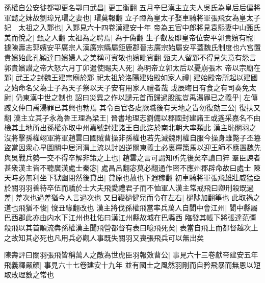孫權自公安徙都卾更名卾曰武昌|{
	更工衡翻}
五月辛巳漢主立夫人吳氏為皇后后偏將軍懿之妹故劉璋兄瑁之妻也|{
	瑁莫報翻}
立子禪為皇太子娶車騎將軍張飛女為皇太子妃　太祖之入鄴也|{
	入鄴見六十四卷漢建安十年}
帝為五官中郎將見袁熙妻中山甄氏美而悅之|{
	甄之人翻}
太祖為之聘焉|{
	為于偽翻}
生子叡及即皇帝位安平郭貴嬪有寵|{
	據陳壽志郭嬪安平廣宗人漢廣宗縣屬鉅鹿郡晉志廣宗始屬安平蓋魏氏制度也六宫置貴嬪始此孔穎達曰嬪婦人之美稱可賓敬也嬪毗賓翻}
甄夫人留鄴不得見失意有怨言郭貴嬪譛之帝大怒六月丁卯遣使賜夫人死|{
	為明帝立郭太后以憂崩張木}
帝以宗廟在鄴|{
	武王之封魏王建宗廟於鄴}
祀太祖於洛陽建始殿如家人禮|{
	建始殿帝所起以建國之始命名父為士子為天子祭以天子安有用家人禮者哉}
戉辰晦日有食之有司奏免太尉|{
	仍東漢中世之制也}
詔曰災異之作以譴元首而歸過股肱豈禹湯罪已之義乎|{
	左傳臧文仲曰禹湯罪已其興也勃焉}
其令百官各䖍厥職後有天地之眚勿復劾三公|{
	復扶又翻}
漢主立其子永為魯王理為梁王|{
	晉書地理志劉備以郡國封建諸王或遙采嘉名不由檢其土地所出孫權亦取中州嘉號封建諸王自此迄於南北朝大率類此}
漢主恥關羽之沒將擊孫權翊軍將軍趙雲曰國賊曹操非孫權也若先滅魏則權自服今操身雖斃子丕簒盜當因衆心早圖關中居河渭上流以討凶逆關東義士必裏糧策馬以迎王師不應置魏先與吳戰兵勢一交不得卒解非策之上也|{
	趙雲之言可謂知所先後矣卒讀曰猝}
羣臣諫者甚衆漢主皆不聽廣漢處士秦宓|{
	處昌呂翻宓莫必翻通作密不應州郡辟命故曰處士}
陳天時必無利坐下獄幽閉然後貸出|{
	貸原也赦也下遐稼翻}
初車騎將軍張飛雄壯威猛亞於關羽羽善待卒伍而驕於士大夫飛愛禮君子而不恤軍人漢主常戒飛曰卿刑殺既過差|{
	差次也過差猶今人言過次也}
又日鞭檛健兒而令在左右|{
	檛陟加翻箠也}
此取禍之道也飛猶不悛|{
	悛丑緣翻改也}
漢主將伐孫權飛當率兵萬人自閬中會江州|{
	閬中縣屬巴西郡此亦由内水下江州也杜佑曰漢江州縣故城在巴縣西}
臨發其帳下將張達范彊殺飛以其首順流犇孫權漢主聞飛營都督有表曰噫飛死矣|{
	表當自飛上而都督越次上之故知其必死也凡用兵必觀人事既失關羽又喪張飛兵可以無出矣}


陳壽評曰關羽張飛皆稱萬人之敵為世虎臣羽報效曹公|{
	事見六十三卷獻帝建安五年}
飛義釋嚴顔|{
	事見六十七卷建安十九年}
並有國士之風然羽剛而自矜飛暴而無恩以短取敗理數之常也


